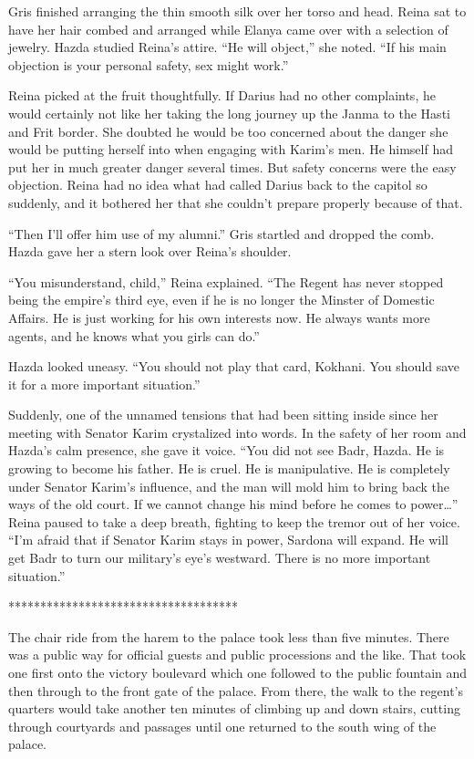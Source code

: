 \documentclass{article}
\begin{document}
	Gris finished arranging the thin smooth silk over her torso and head. Reina sat to have her hair combed and arranged while Elanya came over with a selection of jewelry. Hazda studied Reina’s attire. “He will object,” she noted. “If his main objection is your personal safety, sex might work.” 
	
	Reina picked at the fruit thoughtfully. If Darius had no other complaints, he would certainly not like her taking the long journey up the Janma to the Hasti and Frit border. She doubted he would be too concerned about the danger she would be putting herself into when engaging with Karim’s men. He himself had put her in much greater danger several times. But safety concerns were the easy objection. Reina had no idea what had called Darius back to the capitol so suddenly, and it bothered her that she couldn’t prepare properly because of that. 
	
	“Then I’ll offer him use of my alumni.” Gris startled and dropped the comb. Hazda gave her a stern look over Reina’s shoulder. 
	
	“You misunderstand, child,” Reina explained. “The Regent has never stopped being the empire’s third eye, even if he is no longer the Minster of Domestic Affairs. He is just working for his own interests now. He always wants more agents, and he knows what you girls can do.”
	
	Hazda looked uneasy. “You should not play that card, Kokhani. You should save it for a more important situation.” 
	
	Suddenly, one of the unnamed tensions that had been sitting inside since her meeting with Senator Karim crystalized into words. In the safety of her room and Hazda’s calm presence, she gave it voice. “You did not see Badr, Hazda. He is growing to become his father. He is cruel. He is manipulative. He is completely under Senator Karim’s influence, and the man will mold him to bring back the ways of the old court. If we cannot change his mind before he comes to power…” Reina paused to take a deep breath, fighting to keep the tremor out of her voice. “I’m afraid that if Senator Karim stays in power, Sardona will expand. He will get Badr  to turn our military’s eye’s westward. There is no more important situation.”
	
	************************************
	
	The chair ride from the harem to the palace took less than five minutes. There was a public way for official guests and public processions and the like. That took one first onto the victory boulevard which one followed to the public fountain and then through to the front gate of the palace. From there, the walk to the regent’s quarters would take another ten minutes of climbing up and down stairs, cutting through courtyards and passages until one returned to the south wing of the palace.
	
\end{document}
